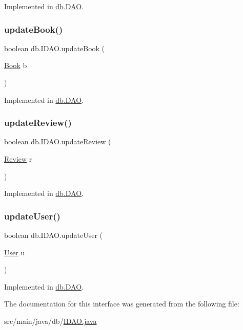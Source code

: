 Implemented in \hyperlink{classdb_1_1_d_a_o_a1600c5d7d28eb225fc7c244fdfb16150}{db.\+D\+AO}.

\mbox{\label{interfacedb_1_1_i_d_a_o_a202354d7a3e1231687d543e82c15a6f5}} 
\subsubsection{\texorpdfstring{update\+Book()}{updateBook()}}
{\footnotesize\ttfamily boolean db.\+I\+D\+A\+O.\+update\+Book (\begin{DoxyParamCaption}\item[{\hyperlink{classserver_1_1data_1_1_book}{Book}}]{b }\end{DoxyParamCaption})}



Implemented in \hyperlink{classdb_1_1_d_a_o_a4ea10c177ef93a3084ed74b38556adca}{db.\+D\+AO}.

\mbox{\label{interfacedb_1_1_i_d_a_o_a7288e76ee3ce667c0d0d7ecaeef0d94e}} 
\subsubsection{\texorpdfstring{update\+Review()}{updateReview()}}
{\footnotesize\ttfamily boolean db.\+I\+D\+A\+O.\+update\+Review (\begin{DoxyParamCaption}\item[{\hyperlink{classserver_1_1data_1_1_review}{Review}}]{r }\end{DoxyParamCaption})}



Implemented in \hyperlink{classdb_1_1_d_a_o_ab73940ac7600902ea7d52bcd041a9c6e}{db.\+D\+AO}.

\mbox{\label{interfacedb_1_1_i_d_a_o_adbc5f00b7bcdffb6692367a3c9564193}} 
\subsubsection{\texorpdfstring{update\+User()}{updateUser()}}
{\footnotesize\ttfamily boolean db.\+I\+D\+A\+O.\+update\+User (\begin{DoxyParamCaption}\item[{\hyperlink{classserver_1_1data_1_1_user}{User}}]{u }\end{DoxyParamCaption})}



Implemented in \hyperlink{classdb_1_1_d_a_o_a5cd4462deb77065c2d12471cd73b3ec8}{db.\+D\+AO}.



The documentation for this interface was generated from the following file\+:\begin{DoxyCompactItemize}
\item 
src/main/java/db/\hyperlink{_i_d_a_o_8java}{I\+D\+A\+O.\+java}\end{DoxyCompactItemize}
